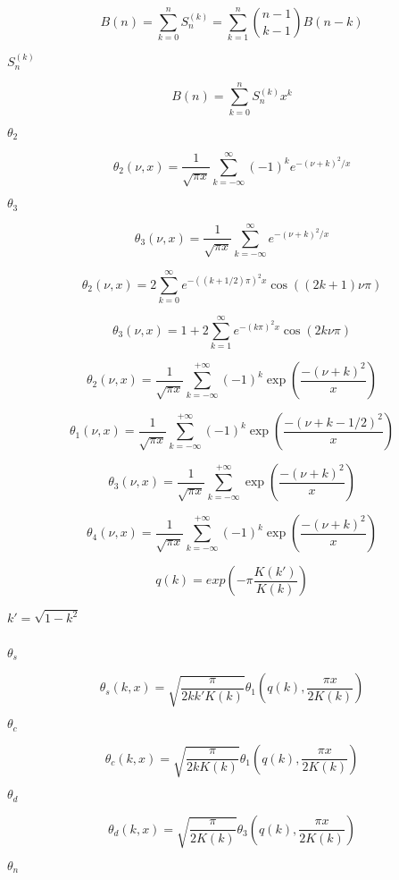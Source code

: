 \documentclass{article}
\begin{document}
\[ B(n) = \sum_{k=0}^{n}S_n^{(k)} = \sum_{k=1}^{n}{n-1 \choose k-1}B(n-k) \]
\pagebreak

$ S_n^{(k)} $
\pagebreak

\[ B(n) = \sum_{k=0}^{n}S_n^{(k)}x^k \]
\pagebreak

$ \theta_2 $
\pagebreak

\[ \theta_2(\nu, x) = \frac{1}{\sqrt{\pi x}} \sum_{k=-\infty}^{\infty}(-1)^k e^{-(\nu+k)^2/x} \]
\pagebreak

$ \theta_3 $
\pagebreak

\[ \theta_3(\nu, x) = \frac{1}{\sqrt{\pi x}} \sum_{k=-\infty}^{\infty} e^{-(\nu+k)^2/x} \]
\pagebreak

\[ \theta_2(\nu, x) = 2\sum_{k=0}^{\infty} e^{-((k+1/2)\pi)^2 x} \cos((2k+1)\nu\pi) \]
\pagebreak

\[ \theta_3(\nu, x) = 1 + 2\sum_{k=1}^{\infty} e^{-(k\pi)^2 x} \cos(2k\nu\pi) \]
\pagebreak

\[ \theta_2(\nu,x) = \frac{1}{\sqrt{\pi x}} \sum_{k=-\infty}^{+\infty} (-1)^k \exp\left( \frac{-(\nu + k)^2}{x} \right) \]
\pagebreak

\[ \theta_1(\nu,x) = \frac{1}{\sqrt{\pi x}} \sum_{k=-\infty}^{+\infty} (-1)^k \exp\left( \frac{-(\nu + k - 1/2)^2}{x} \right) \]
\pagebreak

\[ \theta_3(\nu,x) = \frac{1}{\sqrt{\pi x}} \sum_{k=-\infty}^{+\infty} \exp\left( \frac{-(\nu+k)^2}{x} \right) \]
\pagebreak

\[ \theta_4(\nu,x) = \frac{1}{\sqrt{\pi x}} \sum_{k=-\infty}^{+\infty} (-1)^k \exp\left( \frac{-(\nu + k)^2}{x} \right) \]
\pagebreak

\[ q(k) = exp\left(-\pi\frac{K(k')}{K(k)}\right) \]
\pagebreak

$ k' = \sqrt{1 - k^2} $
\pagebreak

$ $
\pagebreak

$ \theta_s $
\pagebreak

\[ \theta_s(k,x) = \sqrt{\frac{\pi}{2 k k' K(k)}} \theta_1\left(q(k),\frac{\pi x}{2K(k)}\right) \]
\pagebreak

$ \theta_c $
\pagebreak

\[ \theta_c(k,x) = \sqrt{\frac{\pi}{2 k K(k)}} \theta_1\left(q(k),\frac{\pi x}{2K(k)}\right) \]
\pagebreak

$ \theta_d $
\pagebreak

\[ \theta_d(k,x) = \sqrt{\frac{\pi}{2K(k)}} \theta_3\left(q(k),\frac{\pi x}{2K(k)}\right) \]
\pagebreak

$ \theta_n $
\pagebreak
\end{document}
